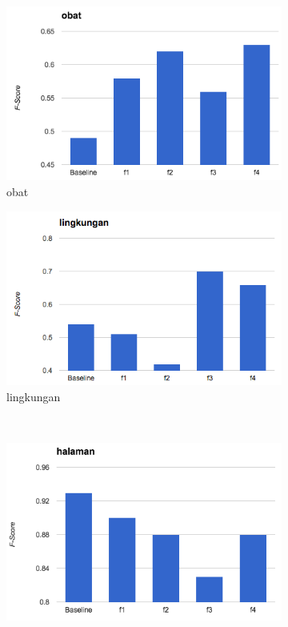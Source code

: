 \begin{figure}[H]
\begin{subfigure}{.5\textwidth}
		\centering
		\includegraphics[width=1\linewidth]{adit_pics/obat.png}
		\caption{obat}
	\end{subfigure}%
	\begin{subfigure}{.5\textwidth}
		\centering
		\includegraphics[width=1\linewidth]{adit_pics/lingkungan.png}
		\caption{lingkungan}
	\end{subfigure}%
	\\
	\begin{subfigure}{.5\textwidth}
		\centering
		\includegraphics[width=1\linewidth]{adit_pics/halaman.png}

\end{subfigure}
\end{figure}
